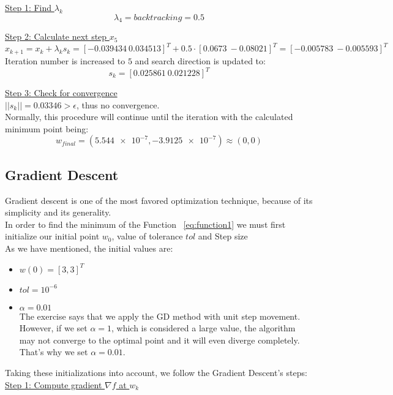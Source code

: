\underline{Step 1: Find $\lambda_k$}
\[
\lambda_4 = \textit{backtracking} = 0.5
\]

\underline{Step 2: Calculate next step $x_{5}$}
\[
x_{k+1} = x_k + \lambda_k s_k = [-0.039434\ 0.034513]^T + 0.5 \cdot [0.0673\ -0.08021]^T = [-0.005783\ -0.005593]^T
\]
Iteration number is increased to $5$ and search direction is updated to:
\[
s_k = [0.025861\ 0.021228]^T
\]

\underline{Step 3: Check for convergence}\\[2mm]
$||s_k|| = 0.03346 > \epsilon$, thus no convergence.\\[3mm]

Normally, this procedure will continue until the  iteration with the calculated minimum point being:
\[
w_{final} = \left( \num{5.544e-7}, \num{-3.9125e-7} \right) \approx (0,0)
\]

\subsection{Gradient Descent}
Gradient descent is one of the most favored optimization technique, because of its simplicity and its generality.\\
In order to find the minimum of the Function ~\ref{eq:function1} we must first initialize our initial point $w_{0}$, value of tolerance $tol$ and Step size\\
As we have mentioned, the initial values are:
\begin{itemize}
	\item $w\left(0\right) = \left[3, 3\right]^T$
	\item $tol = 10^{-6}$
	\item $\alpha = 0.01$\\
	The exercise says that we apply the GD method with unit step movement. However, if we set $\alpha = 1$, which is considered a large value, the algorithm may not converge to the optimal point and it will even diverge completely. That's why we set $\alpha = 0.01$. 
\end{itemize} 
\vspace{2mm}

Taking these initializations into account, we follow the Gradient Descent's steps:\\

\underline{Step 1: Compute gradient $\nabla f$ at $w_{k}$}
\vspace{4mm}

